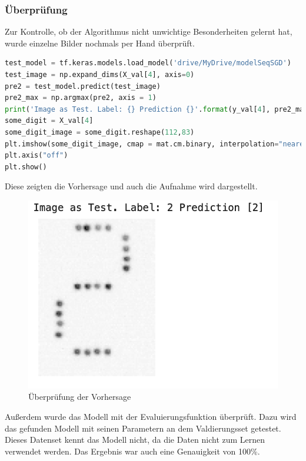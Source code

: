 \subsubsection{Überprüfung} \label{Überprüfung}
Zur Kontrolle, ob der Algorithmus nicht unwichtige Besonderheiten gelernt hat, wurde einzelne Bilder nochmals per Hand überprüft.\\
\begin{lstlisting}[language = Python]
test_model = tf.keras.models.load_model('drive/MyDrive/modelSeqSGD')
test_image = np.expand_dims(X_val[4], axis=0)
pre2 = test_model.predict(test_image)
pre2_max = np.argmax(pre2, axis = 1)
print('Image as Test. Label: {} Prediction {}'.format(y_val[4], pre2_max))
some_digit = X_val[4]
some_digit_image = some_digit.reshape(112,83)
plt.imshow(some_digit_image, cmap = mat.cm.binary, interpolation="nearest")
plt.axis("off")
plt.show()
\end{lstlisting}
Diese zeigten die Vorhersage und auch die Aufnahme wird dargestellt.
\begin{figure}[h]
\centering
\includegraphics[scale=0.5]{pic/Prediction}
\caption{Überprüfung der Vorhersage}
\end{figure}
Außerdem wurde das Modell mit der Evaluierungsfunktion überprüft. Dazu wird das gefunden Modell mit seinen Parametern an dem Valdierungsset getestet. Dieses Datenset kennt das Modell nicht, da die Daten nicht zum Lernen verwendet werden.
Das Ergebnis war auch eine Genauigkeit von 100\%.







